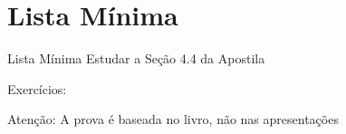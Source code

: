 \section{Lista Mínima}

\begin{frame}{Lista Mínima}
  Estudar a Seção 4.4 da Apostila

  Exercícios:

  \vfill
  Atenção: A prova é baseada no livro, não nas apresentações
\end{frame}


